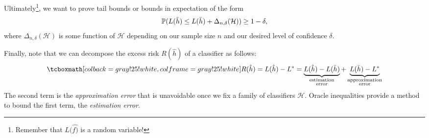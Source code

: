 Ultimately\footnote{Remember that $L(\hat{f)}$ is a random variable!}, we want to prove tail bounds or bounds in expectation of the form
\[
    \operatorname{\mathbb{P}}(L(\hat{h}) \leq L(\bar{h}) + \Delta_{n, \delta}(\mathcal{H})) \geq 1 - \delta,
\]
where $\Delta_{n, \delta}(\mathcal{H})$ is some function of $\mathcal{H}$ depending on our sample size $n$ and our desired level of confidence $\delta$.

Finally, note that we can decompose the excess risk $R(\hat{h})$ of a classifier as follows:
\[
    \highlightMath{
        R(\hat{h}) = L(\hat{h}) - L^* = \underbrace{L(\hat{h}) - L(\bar{h})}_{\substack{\text{estimation} \\ \text{error}}} + \underbrace{L(\bar{h}) - L^*}_{\substack{\text{approximation} \\ \text{error}}}
    }
\]
The second term is the \emph{approximation error} that is unavoidable once we fix a family of classifiers $\mathcal{H}$. Oracle inequalities provide a method to bound the first term, the \emph{estimation error}.
